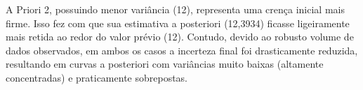\documentclass[brazil, a4paper, 12pt]{article}
\begin{document}
A Priori 2, possuindo menor variância (12), representa uma crença inicial mais firme. Isso fez com que sua estimativa a posteriori (12,3934) ficasse ligeiramente mais retida ao redor do valor prévio (12). Contudo, devido ao robusto volume de dados observados, em ambos os casos a incerteza final foi drasticamente reduzida, resultando em curvas a posteriori com variâncias muito baixas (altamente concentradas) e praticamente sobrepostas.
\end{document}
